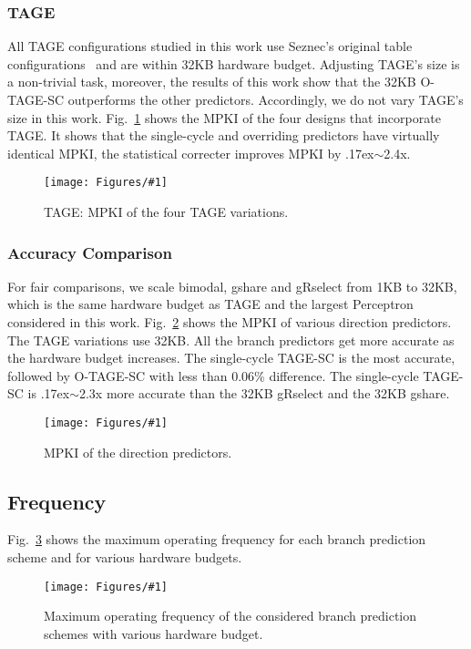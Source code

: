 \documentclass[conference]{IEEEtran}
\newcommand{\mytilde}{{\raise.17ex\hbox{$\scriptstyle\sim$}}}
\newcommand{\kfig}[4]{ %
        \begin{figure}[!t]
        \centering
        \texttt{[image: Figures/\#1]}
        \vspace{-1mm}
        \caption{#3}
        \vspace{-6mm}
        \label{#2}
        \end{figure}
}
\begin{document}
\subsubsection{TAGE}
\label{sec:eval:accuracy:tage}
All TAGE configurations studied in this work use Seznec's original table configurations~\cite{tage} and are within 32KB hardware budget. Adjusting TAGE's size is a non-trivial task, moreover, the results of this work show that the 32KB \mbox{O-TAGE-SC} outperforms the other predictors. Accordingly, we do not vary TAGE's size in this work. Fig.~\ref{fig:tageMPKI} shows the MPKI of the four designs that incorporate TAGE. It shows that the single-cycle and overriding predictors have virtually identical MPKI, the statistical correcter improves MPKI by \mytilde 2.4x.
\kfig{tageMPKI.pdf}{fig:tageMPKI}{TAGE: MPKI of the four TAGE variations.}{angle = 0, trim = 0.7in 2.6in 1in 2.7in, clip, width=0.35\textwidth}



\subsubsection{Accuracy Comparison}
\label{sec:eval:accuracy:comparison}
For fair comparisons, we scale bimodal, gshare and gRselect from 1KB to 32KB, which is the same hardware budget as TAGE and the largest Perceptron considered in this work. Fig.~\ref{fig:admpki} shows the MPKI of various direction predictors. The TAGE variations use 32KB. All the branch predictors get more accurate as the hardware budget increases. The single-cycle \mbox{TAGE-SC} is the most accurate, followed by \mbox{O-TAGE-SC} with less than 0.06\% difference. The single-cycle \mbox{TAGE-SC} is \mytilde 2.3x more accurate than the 32KB gRselect and the 32KB gshare.
\kfig{admpki.pdf}{fig:admpki}{MPKI of the direction predictors.}{angle = 0, trim = 0.9in 2.7in 0.8in 2.7in, clip, width=0.5\textwidth}

\subsection{Frequency}
\label{sec:eval:fmax}
Fig.~\ref{fig:adfmax} shows the maximum operating frequency for each branch prediction scheme and for various hardware budgets.
\kfig{adfmax.pdf}{fig:adfmax}{Maximum operating frequency of the considered branch prediction schemes with various hardware budget.}{angle = 0, trim = 0.8in 4.6in 0.7in 5.2in, clip, width=0.5\textwidth}
\end{document}
